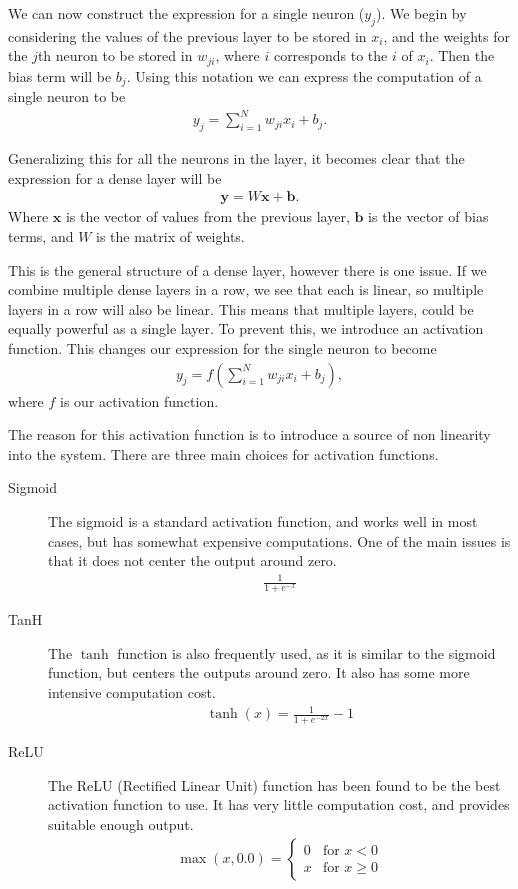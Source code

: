 \documentclass{amsart}
\begin{document}
We can now construct the expression for a single neuron ($y_j$). We begin by
considering the values of the previous layer to be stored in $x_i$, and the
weights for the $j$th neuron to be stored in $w_{ji}$, where $i$ corresponds to
the $i$ of $x_i$. Then the bias term will be $b_j$. Using this notation we can
express the computation of a single neuron to be
\begin{align*}
  y_j=\sum_{i=1}^Nw_{ji}x_i+b_j.
\end{align*}

Generalizing this for all the neurons in the layer, it becomes clear that the
expression for a dense layer will be
\begin{align*}
  \mathbf{y}=W\mathbf{x}+\mathbf{b}.
\end{align*}
Where $\mathbf{x}$ is the vector of values from the previous layer,
$\mathbf{b}$ is the vector of bias terms, and $W$ is the matrix of weights.

This is the general structure of a dense layer, however there is one issue. If
we combine multiple dense layers in a row, we see that each is linear, so
multiple layers in a row will also be linear. This means that multiple layers,
could be equally powerful as a single layer. To prevent this, we introduce an
activation function. This changes our expression for the single neuron to
become
\begin{align*}
  y_j=f\left(\sum_{i=1}^Nw_{ji}x_i+b_j\right),
\end{align*}
where $f$ is our activation function.

The reason for this activation function is to introduce a source of
non linearity into the system. There are three main choices for activation
functions.
\begin{description}
  \item[Sigmoid] The sigmoid is a standard activation function, and works well
    in most cases, but has somewhat expensive computations. One of the main
    issues is that it does not center the output around zero.
    \begin{align*}
      \frac{1}{1+e^{-x}}
    \end{align*}
  \item[TanH] The $\tanh$ function is also frequently used, as it is similar to
    the sigmoid function, but centers the outputs around zero. It also has some
    more intensive computation cost.
    \begin{align*}
      \tanh(x)=\frac{1}{1+e^{-2x}}-1
    \end{align*}
  \item[ReLU] The ReLU (Rectified Linear Unit) function has been found to be
    the best activation function to use. It has very little computation cost,
    and provides suitable enough output.
    \begin{align*}
      \max(x,0.0)=\begin{cases}
        0 & \text{for }  x<0\\
        x & \text{for } x\geq 0
      \end{cases}
    \end{align*}
\end{description}
\end{document}

